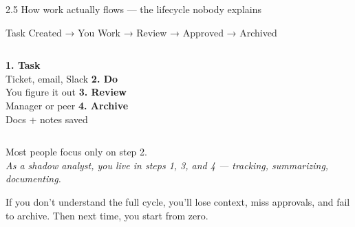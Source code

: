 \documentclass[aspectratio=169, 11pt]{beamer}
\begin{document}
	\begin{frame}{2.5 How work actually flows — the lifecycle nobody explains}
		\begin{center}
			\Large{Task Created → You Work → Review → Approved → Archived}
		\end{center}
		\vspace{0.3cm}
		\begin{columns}[T]
			\textbf{1. Task} \\
			\small{Ticket, email, Slack}
			\textbf{2. Do} \\
			\small{You figure it out}
			\textbf{3. Review} \\
			\small{Manager or peer}
			\textbf{4. Archive} \\
			\small{Docs + notes saved}
		\end{columns}
		\vspace{0.3cm}
		\alert{Most people focus only on step 2.} \\
		\textit{As a shadow analyst, you live in steps 1, 3, and 4 — tracking, summarizing, documenting.}
		
		\vspace{0.2cm}
		\small{If you don't understand the full cycle, you'll lose context, miss approvals, and fail to archive. Then next time, you start from zero.}
	\end{frame}
	
\end{document}
